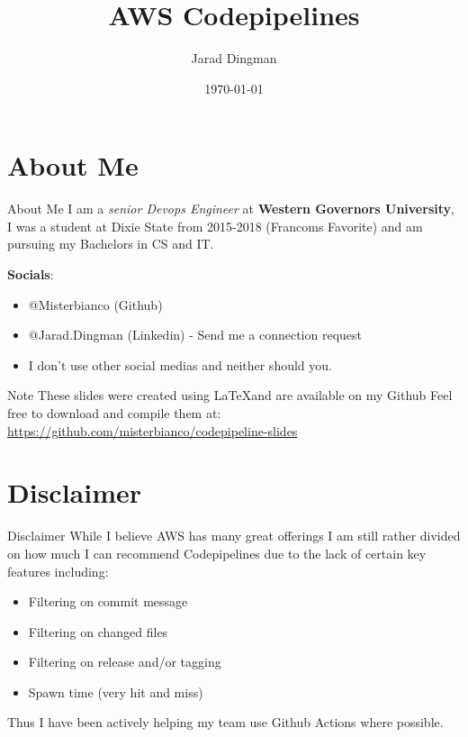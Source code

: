 \documentclass{beamer}
\title{AWS Codepipelines}
\date{\today}
\author{Jarad Dingman}
\begin{document}
  \maketitle

  \section{About Me}

    \begin{frame}{About Me}
      I am a \textit{senior Devops Engineer} at \textbf{Western Governors University}, 
      I was a student at Dixie State from 2015-2018 (Francoms Favorite) and am pursuing 
      my Bachelors in CS and IT.

      \textbf{Socials}:
      \begin{itemize}
        \item @Misterbianco (Github)
        \item @Jarad.Dingman (Linkedin) - Send me a connection request
        \item I don't use other social medias and neither should you.
      \end{itemize}
    \end{frame}

    \begin{frame}{Note}
      These slides were created using \LaTeX and are available on my Github
      Feel free to download and compile them at: 
        \url{https://github.com/misterbianco/codepipeline-slides}
    \end{frame}

  \section{Disclaimer}

    \begin{frame}{Disclaimer}
      While I believe AWS has many great offerings I am still rather divided
      on how much I can recommend Codepipelines due to the lack of certain key
      features including:

      \begin{itemize}
        \item Filtering on commit message
        \item Filtering on changed files
        \item Filtering on release and/or tagging
        \item Spawn time (very hit and miss)
      \end{itemize}

      Thus I have been actively helping my team use Github Actions where possible.
    \end{frame}
\end{document}
